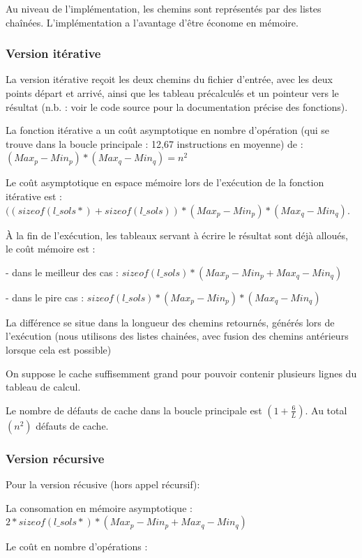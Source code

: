 \documentclass[paper=a4, fontsize=11pt]{scrartcl} %
\begin{document}
Au niveau de l'implémentation, les chemins sont représentés par des listes chaînées.
L'implémentation a l'avantage d'être économe en mémoire.

\subsubsection*{Version itérative}

La version itérative reçoit les deux chemins du fichier d'entrée, avec les deux points départ et arrivé, ainsi que les tableau précalculés et un pointeur vers le résultat (n.b. : voir le code source pour la documentation précise des fonctions).

La fonction itérative a un coût asymptotique en nombre d'opération (qui se trouve dans la boucle principale : 12,67 instructions en moyenne) de : $ (Max_p - Min_p) * (Max_q - Min_q) = n^2$

Le coût asymptotique en espace mémoire lors de l'exécution de la fonction itérative est : $ ((sizeof(l\_sols *) + sizeof(l\_sols)) * (Max_p - Min_p) * (Max_q - Min_q) $.

À la fin de l'exécution, les tableaux servant à écrire le résultat sont déjà alloués, le coût mémoire est :

- dans le meilleur des cas : $sizeof(l\_sols) * (Max_p - Min_p + Max_q - Min_q)$

- dans le pire cas : $ sizeof(l\_sols) * (Max_p - Min_p) * (Max_q - Min_q) $

La différence se situe dans la longueur des chemins retournés, générés lors de l'exécution (nous utilisons des listes chainées, avec fusion des chemins antérieurs lorsque cela est possible)

On suppose le cache suffisemment grand pour pouvoir contenir plusieurs lignes du tableau de calcul.

Le nombre de défauts de cache dans la boucle principale est $(1 + \frac{6}{L})$. Au total $(n^2)$ défauts de cache.

\subsubsection*{Version récursive}

Pour la version récusive (hors appel récursif):

La consomation en mémoire asymptotique : $ 2 * sizeof(l\_sols *) * (Max_p - Min_p + Max_q - Min_q) $

Le coût en nombre d'opérations :
\end{document}
